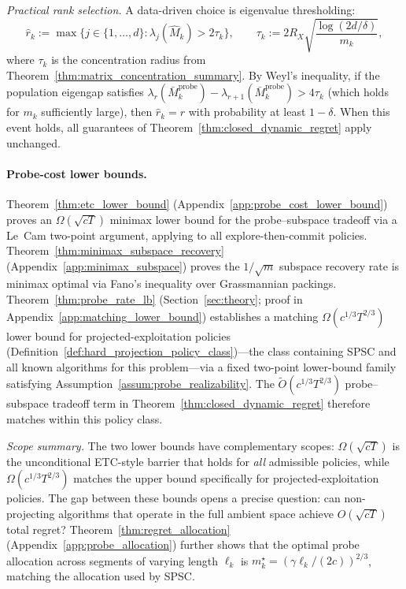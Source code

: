 \documentclass{article}
\begin{document}
  \emph{Practical rank selection.}
  A data-driven choice is eigenvalue thresholding:
  \begin{equation}
  \label{eq:rank_selection}
  \hat r_k := \max\!\bigl\{j \in \{1,\ldots,d\} :
    \lambda_j(\widehat M_k) > 2\tau_k\bigr\},
  \qquad
  \tau_k := 2R_X\sqrt{\frac{\log(2d/\delta)}{m_k}},
  \end{equation}
  where $\tau_k$ is the concentration radius from
  Theorem~\ref{thm:matrix_concentration_summary}.
  By Weyl's inequality, if the population eigengap satisfies
  $\lambda_r(\bar M_k^{\mathrm{probe}}) - \lambda_{r+1}(\bar M_k^{\mathrm{probe}})
  > 4\tau_k$ (which holds for $m_k$ sufficiently large), then
  $\hat r_k = r$ with probability at least $1-\delta$.
  When this event holds, all guarantees of
  Theorem~\ref{thm:closed_dynamic_regret} apply unchanged.

\paragraph{Probe-cost lower bounds.}
  Theorem~\ref{thm:etc_lower_bound} (Appendix~\ref{app:probe_cost_lower_bound}) proves an $\Omega(\sqrt{cT})$ minimax lower bound for
   the probe--subspace tradeoff via a Le~Cam two-point argument, applying to all explore-then-commit policies.
  Theorem~\ref{thm:minimax_subspace_recovery} (Appendix~\ref{app:minimax_subspace}) proves the $1/\sqrt{m}$ subspace recovery rate is minimax optimal via Fano's inequality over Grassmannian packings.
  Theorem~\ref{thm:probe_rate_lb} (Section~\ref{sec:theory}; proof in Appendix~\ref{app:matching_lower_bound}) establishes a matching $\Omega(c^{1/3}T^{2/3})$ lower bound for projected-exploitation policies (Definition~\ref{def:hard_projection_policy_class})---the class containing SPSC and all known algorithms for this problem---via a fixed two-point lower-bound family satisfying Assumption~\ref{assum:probe_realizability}.
  The $\widetilde{O}(c^{1/3}T^{2/3})$ probe--subspace tradeoff term in Theorem~\ref{thm:closed_dynamic_regret} therefore matches within this policy class.

  \emph{Scope summary.} The two lower bounds have complementary scopes: $\Omega(\sqrt{cT})$ is the unconditional ETC-style barrier that holds for \emph{all} admissible policies, while $\Omega(c^{1/3}T^{2/3})$ matches the upper bound specifically for projected-exploitation policies. The gap between these bounds opens a precise question: can non-projecting algorithms that operate in the full ambient space achieve $O(\sqrt{cT})$ total regret?
  Theorem~\ref{thm:regret_allocation} (Appendix~\ref{app:probe_allocation}) further shows that the optimal probe allocation across segments of varying length $\ell_k$ is $m_k^\star = (\gamma \ell_k / (2c))^{2/3}$, matching the allocation used by SPSC.
\end{document}
